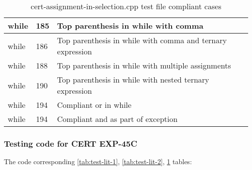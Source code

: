 \begin{table}[H]
\begin{tabular}{|m{}|m{}|m{}|}
        \hline 
        while  & 185 & Top parenthesis in while with comma \\
        \hline 
        while  & 186 & Top parenthesis in while with comma and ternary expression \\
        \hline 
        while  & 188 & Top parenthesis in while with multiple assignments \\
        \hline 
        while  & 190 & Top parenthesis in while with nested ternary expression \\
        \hline 
        while  & 194 & Compliant or in while \\
        \hline 
        while  & 194 & Compliant and as part of exception \\
        \hline
    \end{tabular}
    \caption{\\cert-assignment-in-selection.cpp test file compliant cases}
    \label{tab:test-lit-3}
\end{table}

\subsubsection{Testing code for CERT EXP-45C}

The code corresponding \ref{tab:test-lit-1}, \ref{tab:test-lit-2}, \ref{tab:test-lit-3} tables:

\newenvironment{code}{\captionsetup{type=listing}}{}

